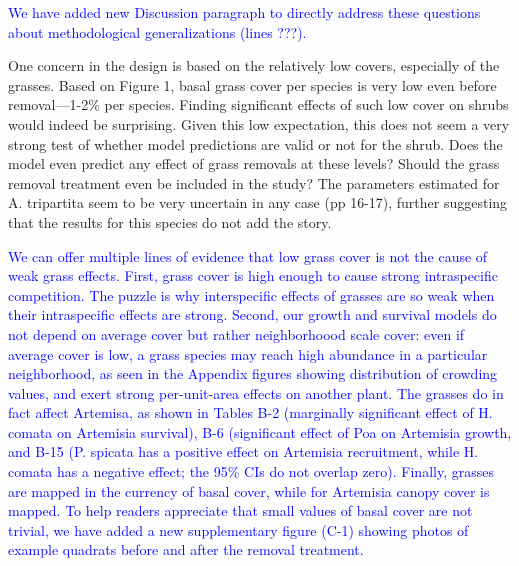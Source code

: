 \documentclass[12pt]{article}
\newcommand{\response}{\textcolor{blue}}
\begin{document}
\response{We have added new Discussion paragraph to directly address these questions about methodological
generalizations (lines ???). }

One concern in the design is based on the relatively low covers, especially of the grasses. Based on
Figure 1, basal grass cover per species is very low even before removal—1-2\% per species. Finding
significant effects of such low cover on shrubs would indeed be surprising. Given this low expectation,
this does not seem a very strong test of whether model predictions are valid or not for the shrub. Does
the model even predict any effect of grass removals at these levels? Should the grass removal
treatment even be included in the study? The parameters estimated for A. tripartita seem to be very
uncertain in any case (pp 16-17), further suggesting that the results for this species do not add the story.

\response{We can offer multiple lines of evidence that low grass cover is not the cause of weak grass effects. 
First, grass cover is high enough to cause strong intraspecific competition. The puzzle is why interspecific effects
of grasses are so weak when their intraspecific effects are strong. Second, our growth and survival models do not
depend on average cover but rather neighborhoood scale cover: even if average cover is low, a
grass species may reach high abundance in a particular neighborhood, as seen in the Appendix figures
showing distribution of crowding values, and exert strong per-unit-area effects on another plant. The grasses do in fact
affect Artemisa, as shown in Tables B-2 (marginally significant effect of H. comata on Artemisia survival), B-6 (significant 
effect of Poa on Artemisia growth, and  B-15 (P. spicata has a positive effect on Artemisia recruitment, while H. comata
has a negative effect; the 95\% CIs do not overlap zero). Finally,
grasses are mapped in the currency of basal cover, while for Artemisia canopy cover is mapped. To help readers
appreciate that small values of basal cover are not trivial, we have added a new supplementary figure (C-1) showing 
photos of example quadrats before and after the removal treatment.  }
\end{document}
